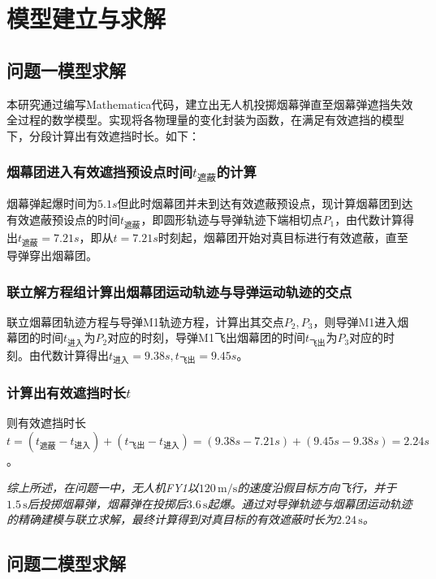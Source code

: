 \documentclass{article}
\begin{document}
\section{模型建立与求解}

\subsection{问题一模型求解}

本研究通过编写Mathematica代码，建立出无人机投掷烟幕弹直至烟幕弹遮挡失效全过程的数学模型。实现将各物理量的变化封装为函数，在满足有效遮挡的模型下，分段计算出有效遮挡时长。如下：

\subsubsection{烟幕团进入有效遮挡预设点时间$t_\text{遮蔽}$的计算}
烟幕弹起爆时间为$5.1s$但此时烟幕团并未到达有效遮蔽预设点，现计算烟幕团到达有效遮蔽预设点的时间$t_\text{遮蔽}$，即圆形轨迹与导弹轨迹下端相切点$P_1$，由代数计算得出$t_\text{遮蔽} = 7.21s$，即从$t=7.21s$时刻起，烟幕团开始对真目标进行有效遮蔽，直至导弹穿出烟幕团。

\subsubsection{联立解方程组计算出烟幕团运动轨迹与导弹运动轨迹的交点}
联立烟幕团轨迹方程与导弹M1轨迹方程，计算出其交点$P_2,P_3$，则导弹M1进入烟幕团的时间$t_{\text{进入}}$为$P_2$对应的时刻，导弹M1飞出烟幕团的时间$t_{\text{飞出}}$为$P_3$对应的时刻。由代数计算得出$t_{\text{进入}} = 9.38s,t_{\text{飞出}} = 9.45s$。

\subsubsection{计算出有效遮挡时长$t$}
则有效遮挡时长$t =(t_\text{遮蔽}- t_\text{进入}) + (t_{\text{飞出}} - t_{\text{进入}}) = (9.38s - 7.21s) + (9.45s - 9.38s) = 2.24s$。

\textit{综上所述，在问题一中，无人机FY1以$120\,\mathrm{m/s}$的速度沿假目标方向飞行，并于$1.5\,\mathrm{s}$后投掷烟幕弹，烟幕弹在投掷后$3.6\,\mathrm{s}$起爆。通过对导弹轨迹与烟幕团运动轨迹的精确建模与联立求解，最终计算得到对真目标的有效遮蔽时长为$2.24\,\mathrm{s}$。}

\subsection{问题二模型求解}
\end{document}
